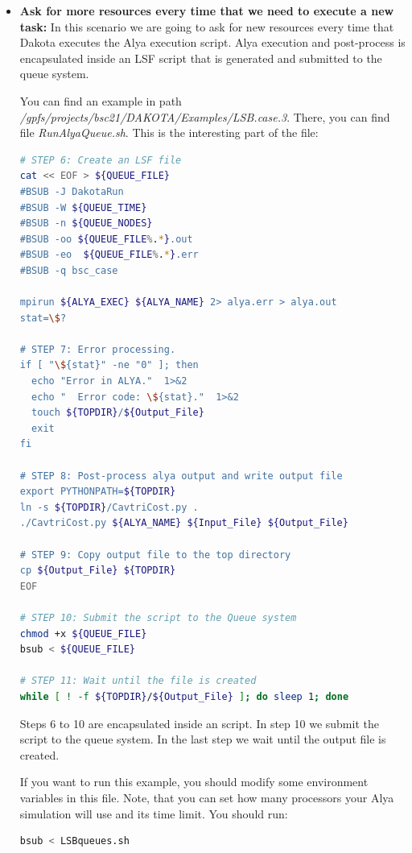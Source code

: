 \documentclass[12pt,a4paper,article]{memoir}
\begin{document}
\begin{itemize}
\item \textbf{Ask for more resources every time that we need to execute a new task:} In this scenario we are going to ask for new resources every time that Dakota executes the Alya execution script. Alya execution and post-process is encapsulated inside an LSF script that is generated and submitted to the queue system.

You can find an example in path \textit{/gpfs/projects/bsc21/DAKOTA/Examples/LSB.case.3}. There, you can find file \textit{RunAlyaQueue.sh}. This is the interesting part of the file:

\begin{lstlisting}[style=MyCodeStyle,language=bash]
# STEP 6: Create an LSF file
cat << EOF > ${QUEUE_FILE}
#BSUB -J DakotaRun 
#BSUB -W ${QUEUE_TIME}
#BSUB -n ${QUEUE_NODES}
#BSUB -oo ${QUEUE_FILE%.*}.out
#BSUB -eo  ${QUEUE_FILE%.*}.err
#BSUB -q bsc_case

mpirun ${ALYA_EXEC} ${ALYA_NAME} 2> alya.err > alya.out
stat=\$?

# STEP 7: Error processing.
if [ "\${stat}" -ne "0" ]; then
  echo "Error in ALYA."  1>&2
  echo "  Error code: \${stat}."  1>&2
  touch ${TOPDIR}/${Output_File}
  exit
fi

# STEP 8: Post-process alya output and write output file
export PYTHONPATH=${TOPDIR}
ln -s ${TOPDIR}/CavtriCost.py .
./CavtriCost.py ${ALYA_NAME} ${Input_File} ${Output_File}

# STEP 9: Copy output file to the top directory
cp ${Output_File} ${TOPDIR}
EOF

# STEP 10: Submit the script to the Queue system
chmod +x ${QUEUE_FILE}
bsub < ${QUEUE_FILE}

# STEP 11: Wait until the file is created
while [ ! -f ${TOPDIR}/${Output_File} ]; do sleep 1; done
\end{lstlisting}

Steps 6 to 10 are encapsulated inside an script. In step 10 we submit the script to the queue system. In the last step we wait until the  output file is created.

If you want to run this example, you should modify some environment variables in this file. Note, that you can set how many processors your Alya simulation will use and its time limit. You should run:
\begin{lstlisting}[style=MyCodeStyle,language=bash]
bsub < LSBqueues.sh
\end{lstlisting}

\end{itemize}
 
\end{document}
